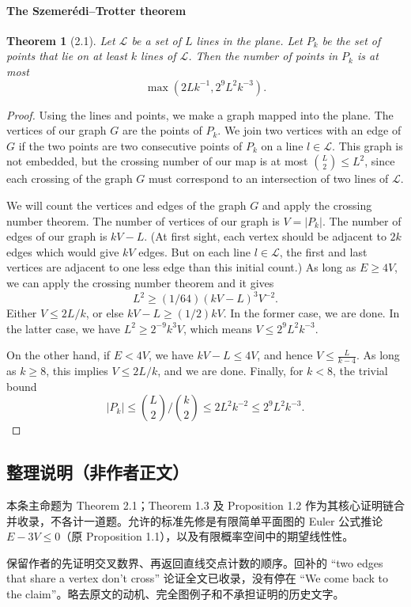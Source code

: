 \documentclass[UTF8,11pt]{ctexart}
\newtheorem*{theorem}{Theorem}
\begin{document}
\paragraph{The Szemer\'edi--Trotter theorem}
\begin{theorem}[2.1]
Let $\mathcal L$ be a set of $L$ lines in the plane. Let $P_k$ be the set of points that lie on at least $k$ lines of $\mathcal L$. Then the number of points in $P_k$ is at most
\[
\max(2Lk^{-1},2^9L^2k^{-3}).
\]
\end{theorem}
\begin{proof}
Using the lines and points, we make a graph mapped into the plane. The vertices of our graph $G$ are the points of $P_k$. We join two vertices with an edge of $G$ if the two points are two consecutive points of $P_k$ on a line $l\in\mathcal L$. This graph is not embedded, but the crossing number of our map is at most $\binom L2\leq L^2$, since each crossing of the graph $G$ must correspond to an intersection of two lines of $\mathcal L$.

We will count the vertices and edges of the graph $G$ and apply the crossing number theorem. The number of vertices of our graph is $V=|P_k|$. The number of edges of our graph is $kV-L$. (At first sight, each vertex should be adjacent to $2k$ edges which would give $kV$ edges. But on each line $l\in\mathcal L$, the first and last vertices are adjacent to one less edge than this initial count.) As long as $E\geq4V$, we can apply the crossing number theorem and it gives
\[
L^2\geq(1/64)(kV-L)^3V^{-2}.
\]
Either $V\leq2L/k$, or else $kV-L\geq(1/2)kV$. In the former case, we are done. In the latter case, we have $L^2\geq2^{-9}k^3V$, which means $V\leq2^9L^2k^{-3}$.

On the other hand, if $E<4V$, we have $kV-L\leq4V$, and hence $V\leq\frac{L}{k-4}$. As long as $k\geq8$, this implies $V\leq2L/k$, and we are done. Finally, for $k<8$, the trivial bound
\[
|P_k|\leq\binom L2/\binom k2\leq2L^2k^{-2}\leq2^9L^2k^{-3}.
\]
\end{proof}


\subsection*{整理说明（非作者正文）}
本条主命题为 Theorem 2.1；Theorem 1.3 及 Proposition 1.2 作为其核心证明链合并收录，不各计一道题。允许的标准先修是有限简单平面图的 Euler 公式推论 $E-3V\leq0$（原 Proposition 1.1），以及有限概率空间中的期望线性性。

保留作者的先证明交叉数界、再返回直线交点计数的顺序。回补的 ``two edges that share a vertex don't cross'' 论证全文已收录，没有停在 ``We come back to the claim''。略去原文的动机、完全图例子和不承担证明的历史文字。
\end{document}
